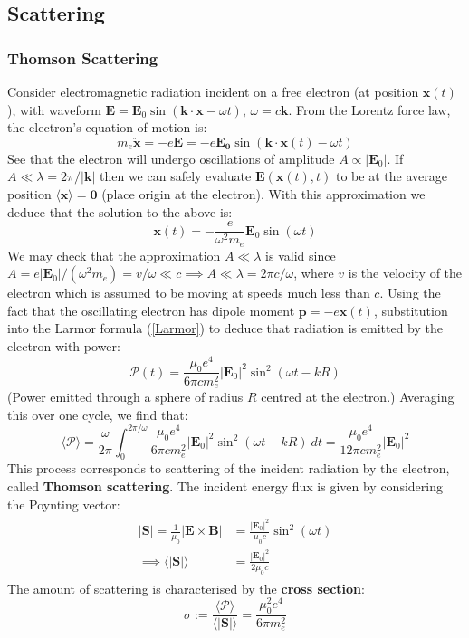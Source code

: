 \documentclass[a4paper]{article}
\numberwithin{equation}{section}
\begin{document}
\subsection{Scattering}
\subsubsection{Thomson Scattering}
Consider electromagnetic radiation incident on a free electron (at position $\bm{x}(t)$), with waveform $\bm{E} =\bm{E}_0 \sin (\bm{k} \cdot \bm{x} - \omega t)$, $\omega = c\bm{k}$. From the Lorentz force law, the electron's equation of motion is:
\begin{equation}
m_e \ddot{\bm{x}} = -e \bm{E} = -e\bm{E_0}\sin(\bm{k}\cdot\bm{x}(t)-\omega t)
\end{equation}
See that the electron will undergo oscillations of amplitude $A \propto |\bm{E}_0|$. If $A \ll \lambda = 2\pi/|\bm{k}|$ then we can safely evaluate $\bm{E}(\bm{x}(t),t)$ to be at the average position $\langle \bm{x} \rangle = \bm{0}$ (place origin at the electron). With this approximation we deduce that the solution to the above is:
\begin{equation}
\bm{x}(t) = -\frac{e}{\omega^2 m_e} \bm{E}_0 \sin(\omega t)
\end{equation}
We may check that the approximation $A \ll \lambda$ is valid since $A = e|\bm{E}_0|/(\omega^2 m_e) = v/\omega \ll c \implies A \ll \lambda = 2\pi c / \omega$, where $v$ is the velocity of the electron which is assumed to be moving at speeds much less than $c$. Using the fact that the oscillating electron has dipole moment $\bm{p} = -e \bm{x}(t)$, substitution into the Larmor formula (\ref{Larmor}) to deduce that radiation is emitted by the electron with power:
\begin{equation}
\mathcal{P}(t) = \frac{\mu_0 e^4}{6 \pi c m_e^2} |\bm{E}_0|^2 \sin^2(\omega t - kR)
\end{equation}
(Power emitted through a sphere of radius $R$ centred at the electron.) Averaging this over one cycle, we find that:
\begin{equation}
\langle \mathcal{P} \rangle = \frac{\omega}{2 \pi} \int_0^{2\pi/ \omega} \frac{\mu_0e^4}{6 \pi c m_e^2}|\bm{E}_0|^2 \sin^2(\omega t -kR) \ dt = \frac{\mu_0 e^4}{12 \pi c m_e^2} |\bm{E}_0|^2
\end{equation}
This process corresponds to scattering of the incident radiation by the electron, called \textbf{Thomson scattering}. The incident energy flux is given by considering the Poynting vector:
\begin{align}
\begin{split}
|\bm{S}| = \frac{1}{\mu_0}| \bm{E} \times \bm{B}| &= \frac{|\bm{E}_0|^2}{\mu_0c} \sin^2(\omega t) \\
\implies \langle |\bm{S}| \rangle &= \frac{|\bm{E}_0|^2}{2 \mu_0 c} 
\end{split}
\end{align}
The amount of scattering is characterised by the \textbf{cross section}:
\begin{equation}
\sigma := \frac{\langle \mathcal{P} \rangle}{\langle |\bm{S}| \rangle} = \frac{\mu_0^2e^4}{6 \pi m_e^2}
\end{equation}
\end{document}
